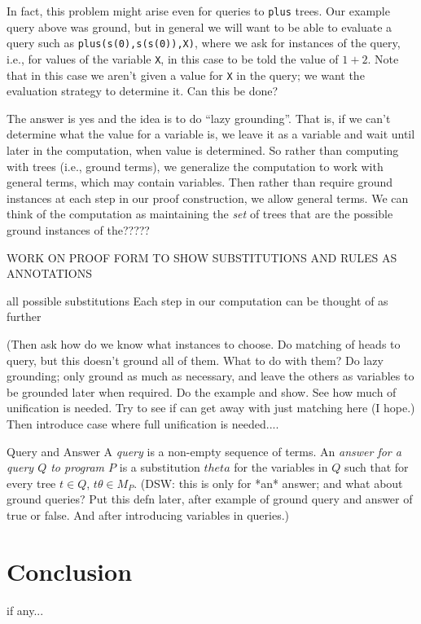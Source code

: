 In fact, this problem might arise even for queries to \verb|plus|
trees.  Our example query above was ground, but in general we will
want to be able to evaluate a query such as
\verb|plus(s(0),s(s(0)),X)|, where we ask for instances of the query,
i.e., for values of the variable \verb|X|, in this case to be told
the value of $1 + 2$.  Note that in this case we aren't given a value
for \verb|X| in the query; we want the evaluation strategy to
determine it.  Can this be done?

The answer is yes and the idea is to do ``lazy grounding''.  That is,
if we can't determine what the value for a variable is, we leave it as
a variable and wait until later in the computation, when value is
determined.  So rather than computing with trees (i.e., ground terms),
we generalize the computation to work with general terms, which may
contain variables.  Then rather than require ground instances at each
step in our proof construction, we allow general terms.  We can think
of the computation as maintaining the {\em set} of trees that are the
possible ground instances of the?????

WORK ON PROOF FORM TO SHOW SUBSTITUTIONS AND RULES AS ANNOTATIONS

all possible
substitutions 
Each step in
our computation can be thought of as further





(Then ask how do we know what instances to choose.  Do matching of
heads to query, but this doesn't ground all of them.  What to do with
them?  Do lazy grounding; only ground as much as necessary, and leave
the others as variables to be grounded later when required.
Do the example and show.  See how much of unification is needed.  Try
to see if can get away with just matching here (I hope.)  Then
introduce case where full unification is needed....


\begin{definition}{Query and Answer}
  A {\em query} is a non-empty sequence of terms.  An {\em answer for
    a query $Q$ to program $P$} is a substitution $theta$ for the
  variables in $Q$ such that for every tree $t \in Q$, $t\theta \in
  M_P$.  (DSW: this is only for *an* answer; and what about ground
  queries?  Put this defn later, after example of ground query and
  answer of true or false. And after introducing variables in
  queries.)
\end{definition}





\section{Conclusion}
if any...
